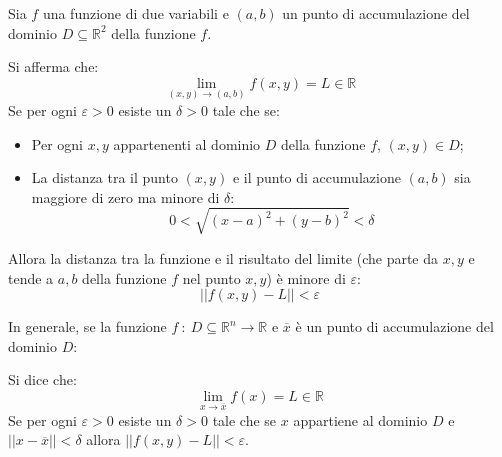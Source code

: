 \documentclass[a4paper]{article}
\begin{document}
	\begin{boxdef}
		Sia $f$ una funzione di due variabili e $\left(a,b\right)$ un punto di accumulazione del dominio $D \subseteq \mathbb{R}^{2}$ della funzione $f$.

		Si afferma che:
		\begin{equation}\label{eq: limite uguale a L}
			\lim_{\left(x,y\right) \rightarrow \left(a,b\right)} f\left(x,y\right) = L \in \mathbb{R}
		\end{equation}
		Se per ogni $\varepsilon > 0$ esiste un $\delta > 0$ tale che se:
		\begin{itemize}
			\item Per ogni $x,y$ appartenenti al dominio $D$ della funzione $f$, $\left(x,y\right) \in D$;
			\item La distanza tra il punto $\left(x,y\right)$ e il punto di accumulazione $\left(a,b\right)$ sia maggiore di zero ma minore di $\delta$:
			\begin{equation*}
				0 < \sqrt{\left(x-a\right)^{2} + \left(y-b\right)^{2}} < \delta
			\end{equation*}
		\end{itemize}
		Allora la distanza tra la funzione e il risultato del limite (che parte da $x,y$ e tende a $a,b$ della funzione $f$ nel punto $x,y$) è minore di $\varepsilon$:
		\begin{equation*}
			\left|\left| f\left(x,y\right) - L \right|\right| < \varepsilon
		\end{equation*}
	\end{boxdef}

	\noindent
	In generale, se la funzione $f \: : \: D \subseteq \mathbb{R}^{n} \rightarrow \mathbb{R}$ e $\overline{x}$ è un punto di accumulazione del dominio $D$:
	\begin{boxdef}
		Si dice che:
		\begin{equation}\label{eq: (generale) limite uguale a L}
			\lim_{x \rightarrow \overline{x}} f\left(x\right) = L\in\mathbb{R}
		\end{equation}
		Se per ogni $\varepsilon > 0$ esiste un $\delta > 0$ tale che se $x$ appartiene al dominio $D$ e $\left|\left| x - \overline{x} \right|\right| < \delta$ allora $\left|\left| f\left(x,y\right) - L \right|\right| < \varepsilon$.
	\end{boxdef}
\end{document}
